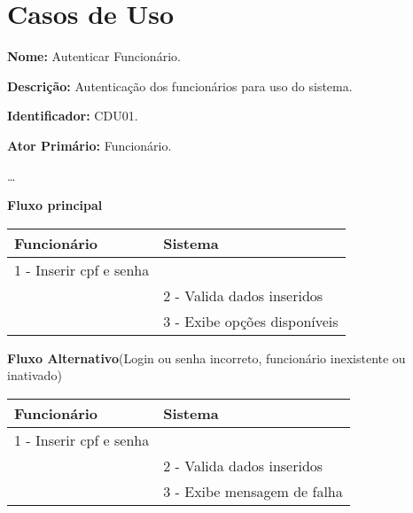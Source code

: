 \section{Casos de Uso}\label{casosdeuso}

\par
\textbf{Nome:} Autenticar Funcionário. 
\par
\textbf{Descrição:} Autenticação dos funcionários para uso do sistema.
\par 
\textbf{Identificador:} CDU01.
\par
\textbf{Ator Primário:} Funcionário.	
\par
\ldots
\par
\textbf{Fluxo principal}\par
\begin{tabular}{|p{7cm}|p{7cm}|}
	\hline 
	Funcionário & Sistema \\ 
	\hline 
	1 - Inserir cpf e senha  &  \\ 
	\hline 
	& 
	
	2 - Valida dados inseridos 
	\\ 
	\hline 
	& 
	
	3 - Exibe opções disponíveis
	\\ 
	\hline 
\end{tabular} 
\vspace{12px}
\par
\textbf{Fluxo Alternativo}(Login ou senha incorreto, funcionário inexistente ou inativado)\par
\begin{tabular}{|p{7cm}|p{7cm}|}
	\hline 
	Funcionário & Sistema \\ 
	\hline 
	1 - Inserir cpf e senha  &  \\ 
	\hline 
	& 
	
	2 - Valida dados inseridos 
	\\ 
	\hline 
	& 
	
	3 - Exibe mensagem de falha		
	\\ 
	\hline 
\end{tabular} 
\vspace{12px}

